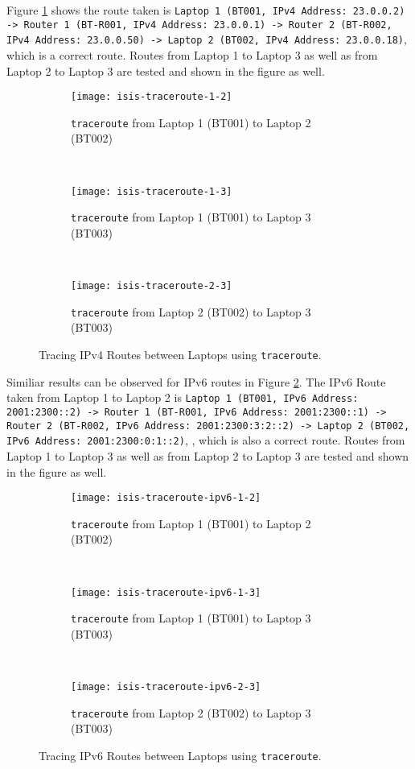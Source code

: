 Figure \ref{fig:isis-traceroute} shows the route taken is 
\texttt{Laptop 1 (BT001, IPv4 Address: 23.0.0.2)
-> Router 1 (BT-R001, IPv4 Address: 23.0.0.1) 
-> Router 2 (BT-R002, IPv4 Address: 23.0.0.50)
-> Laptop 2 (BT002, IPv4 Address: 23.0.0.18)}, which is a correct route.
Routes from Laptop 1 to Laptop 3 as well as from Laptop 2 to Laptop 3 are tested and shown in the figure as well.

\begin{figure}[ht!]
    \centering
    \begin{subfigure}[b]{\textwidth}
        \centering
        \texttt{[image: isis-traceroute-1-2]}
        \caption{\texttt{traceroute} from Laptop 1 (BT001) to Laptop 2 (BT002)}
    \end{subfigure}
    ~
    \begin{subfigure}[b]{\textwidth}
        \centering
        \texttt{[image: isis-traceroute-1-3]}
        \caption{\texttt{traceroute} from Laptop 1 (BT001) to Laptop 3 (BT003)}
    \end{subfigure}
    ~
    \begin{subfigure}[b]{\textwidth}
        \centering
        \texttt{[image: isis-traceroute-2-3]}
        \caption{\texttt{traceroute} from Laptop 2 (BT002) to Laptop 3 (BT003)}
    \end{subfigure}
    \caption{Tracing IPv4 Routes between Laptops using \texttt{traceroute}.}
    \label{fig:isis-traceroute}
\end{figure}

Similiar results can be observed for IPv6 routes in Figure \ref{fig:isis-traceroute-ipv6}. The IPv6 Route taken from Laptop 1 to Laptop 2 is 
\texttt{Laptop 1 (BT001, IPv6 Address: 2001:2300::2)
-> Router 1 (BT-R001, IPv6 Address: 2001:2300::1) 
-> Router 2 (BT-R002, IPv6 Address: 2001:2300:3:2::2)
-> Laptop 2 (BT002, IPv6 Address: 2001:2300:0:1::2)}, , which is also a correct route.
Routes from Laptop 1 to Laptop 3 as well as from Laptop 2 to Laptop 3 are tested and shown in the figure as well.


\begin{figure}[ht!]
    \centering
    \begin{subfigure}[b]{\textwidth}
        \centering
        \texttt{[image: isis-traceroute-ipv6-1-2]}
        \caption{\texttt{traceroute} from Laptop 1 (BT001) to Laptop 2 (BT002)}
    \end{subfigure}
    ~
    \begin{subfigure}[b]{\textwidth}
        \centering
        \texttt{[image: isis-traceroute-ipv6-1-3]}
        \caption{\texttt{traceroute} from Laptop 1 (BT001) to Laptop 3 (BT003)}
    \end{subfigure}
    ~
    \begin{subfigure}[b]{\textwidth}
        \centering
        \texttt{[image: isis-traceroute-ipv6-2-3]}
        \caption{\texttt{traceroute} from Laptop 2 (BT002) to Laptop 3 (BT003)}
    \end{subfigure}
    \caption{Tracing IPv6 Routes between Laptops using \texttt{traceroute}.}
    \label{fig:isis-traceroute-ipv6}
\end{figure}

